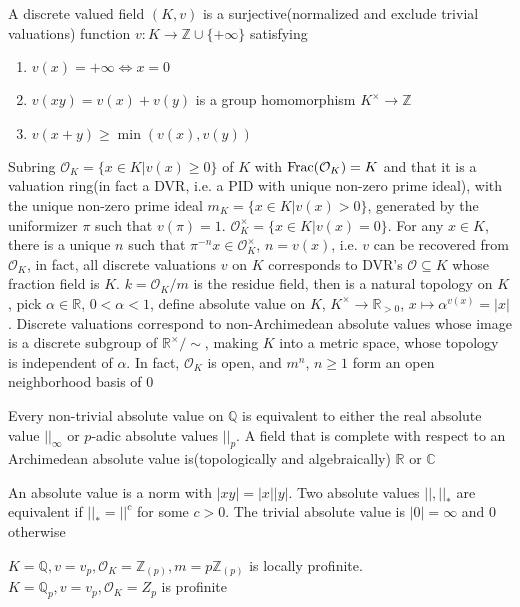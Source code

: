 \documentclass[main]{subfiles}
\begin{document}
A discrete valued field $(K,v)$ is a surjective(normalized and exclude trivial valuations) function $v:K\to\mathbb Z\cup\{+\infty\}$ satisfying
\begin{enumerate}
\item $v(x)=+\infty \iff x=0$
\item $v(xy)=v(x)+v(y)$ is a group homomorphism $K^\times\to\mathbb Z$
\item $v(x+y)\geq\min(v(x),v(y))$
\end{enumerate}
Subring $\mathcal O_K=\{x\in K|v(x)\geq0\}$ of $K$ with $\operatorname{Frac}(\mathcal O_K)=K$ and that it is a valuation ring(in fact a DVR, i.e. a PID with unique non-zero prime ideal), with the unique non-zero prime ideal $m_K=\{x\in K|v(x)>0\}$, generated by the uniformizer $\pi$ such that $v(\pi)=1$. $\mathcal O_K^\times=\{x\in K|v(x)=0\}$. For any $x\in K$, there is a unique $n$ such that $\pi^{-n}x\in\mathcal O_K^\times$, $n=v(x)$, i.e. $v$ can be recovered from $\mathcal O_K$, in fact, all discrete valuations $v$ on $K$ corresponds to DVR's $\mathcal O\subseteq K$ whose fraction field is $K$. $k=\mathcal O_K/m$ is the residue field, then is a natural topology on $K$, pick $\alpha\in\mathbb R$, $0<\alpha<1$, define absolute value on $K$, $K^\times\to\mathbb R_{>0}$, $x\mapsto\alpha^{v(x)}=|x|$. Discrete valuations correspond to non-Archimedean absolute values whose image is a discrete subgroup of $\mathbb R^\times/\sim$, making $K$ into a metric space, whose topology is independent of $\alpha$. In fact, $\mathcal O_K$ is open, and $m^n$, $n\geq1$ form an open neighborhood basis of $0$

\begin{theorem}\label{Ostrowski's theorem}
Every non-trivial absolute value on $\mathbb Q$ is equivalent to either the real absolute value $||_\infty$ or $p$-adic absolute values $||_p$. A field that is complete with respect to an Archimedean absolute value is(topologically and algebraically) $\mathbb R$ or $\mathbb C$
\end{theorem}

\begin{note}
An absolute value is a norm with $|xy|=|x||y|$. Two absolute values $||,||_*$ are equivalent if $||_*=||^c$ for some $c>0$. The trivial absolute value is $|0|=\infty$ and 0 otherwise
\end{note}

\begin{example}
$K=\mathbb Q,v=v_p,\mathcal O_K=\mathbb Z_{(p)}, m=p\mathbb Z_{(p)}$ is locally profinite. $K=\mathbb Q_p,v=v_p,\mathcal O_K=Z_p$ is profinite
\end{example}
\end{document}

